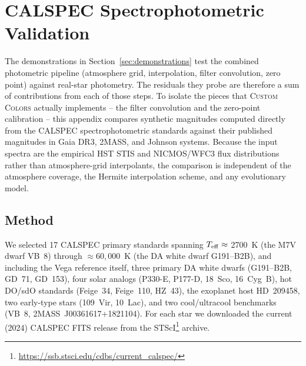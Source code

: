 %

\section{CALSPEC Spectrophotometric Validation}
\label{app:calspec}

The demonstrations in Section~\ref{sec:demonstrations} test the combined
photometric pipeline (atmosphere grid, interpolation, filter convolution, zero
point) against real-star photometry.  The residuals they probe are therefore a
sum of contributions from each of those steps.  To isolate the pieces that
\textsc{Custom Colors} actually implements -- the filter convolution and the
zero-point calibration -- this appendix compares synthetic magnitudes computed
directly from the CALSPEC spectrophotometric standards \citep{Bohlin2014,
Bohlin2019, Bohlin2020} against their published magnitudes in Gaia DR3, 2MASS,
and Johnson systems.  Because the input spectra are the empirical HST STIS
and NICMOS/WFC3 flux distributions rather than atmosphere-grid interpolants,
the comparison is independent of the atmosphere coverage, the Hermite
interpolation scheme, and any evolutionary model.

\subsection{Method}

We selected 17 CALSPEC primary standards spanning $T_{\rm eff} \approx$ 2700~K
(the M7V dwarf VB~8) through $\approx 60{,}000$~K (the DA white dwarf
G191--B2B), and including the Vega reference itself, three primary DA white
dwarfs (G191--B2B, GD~71, GD~153), four solar analogs (P330-E, P177-D,
18~Sco, 16~Cyg~B), hot DO/sdO standards (Feige~34, Feige~110, HZ~43), the
exoplanet host HD~209458, two early-type stars (109~Vir, 10~Lac), and two
cool/ultracool benchmarks (VB~8, 2MASS~J00361617+1821104).  For each star we
downloaded the current (2024) CALSPEC FITS release from the
STScI\footnote{\url{https://ssb.stsci.edu/cdbs/current_calspec/}} archive.

